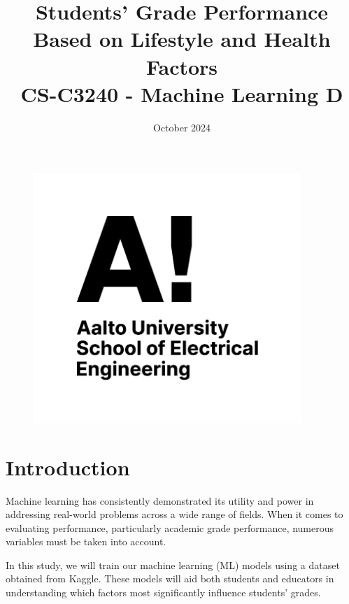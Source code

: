 \documentclass[titlepage]{article}
\begin{document}
\begin{figure}
    \centering
    \includegraphics[width=0.9\textwidth]{logo-86763-1.png}

\end{figure}

\title{
    \textbf{ 
        \Huge Students' Grade Performance Based on Lifestyle and Health Factors
    } 
    \vspace{20pt}
    \\
    \textbf{CS-C3240 - Machine Learning D}
    \\}

    
\date{October 2024}

\maketitle
\newpage
\section{Introduction}
\quad Machine learning has consistently demonstrated its utility and power in addressing real-world problems across a wide range of fields. When it comes to evaluating performance, particularly academic grade performance, numerous variables must be taken into account.

In this study, we will train our machine learning (ML) models using a dataset obtained from Kaggle. These models will aid both students and educators in understanding which factors most significantly influence students' grades.
\end{document}
